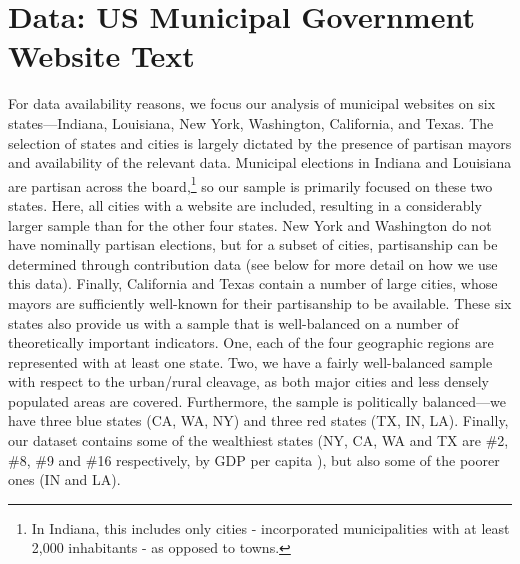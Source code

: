 \documentclass[11pt]{article}
\begin{document}
\section{Data: US Municipal Government Website Text}

For data availability reasons, we focus our analysis of municipal websites on six states---Indiana, Louisiana, New York, Washington, California, and Texas. The selection of states and cities is largely dictated by the presence of partisan mayors and availability of the relevant data. Municipal elections in Indiana and Louisiana are partisan across the board,\footnote{In Indiana, this includes only cities - incorporated municipalities with at least 2,000 inhabitants - as opposed to towns.} so our sample is primarily focused on these two states. Here, all cities with a website are included, resulting in a considerably larger sample than for the other four states. New York and Washington do not have nominally partisan elections, but for a subset of cities, partisanship can be determined through contribution data (see below for more detail on how we use this data). Finally, California and Texas contain a number of large cities, whose mayors are sufficiently well-known for their partisanship to be available. These six states also provide us with a sample that is well-balanced on a number of theoretically important indicators. One, each of the four geographic regions are represented with at least one state. Two, we have a fairly well-balanced sample with respect to the urban/rural cleavage, as both major cities and less densely populated areas are covered. Furthermore, the sample is politically balanced---we have three blue states (CA, WA, NY) and three red states (TX, IN, LA). Finally, our dataset contains some of the wealthiest states (NY, CA, WA and TX are \#2, \#8, \#9 and \#16 respectively, by GDP per capita \citep{BureauofEconomicAnalysis2017}), but also some of the poorer ones (IN and LA). 
\end{document}
